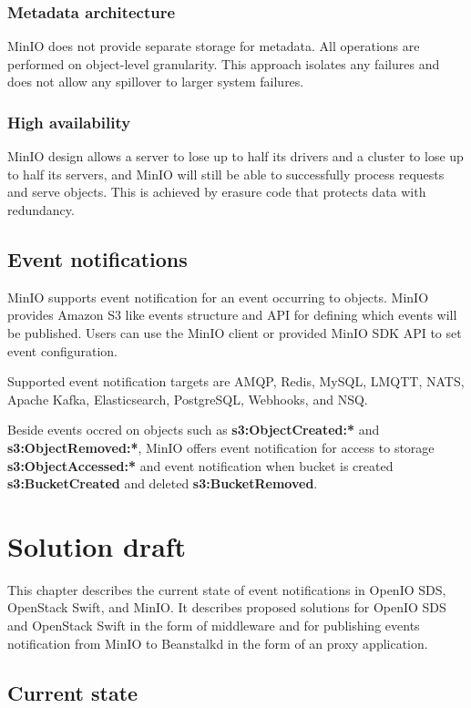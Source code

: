     \subsection*{Metadata architecture}
    MinIO does not provide separate storage for metadata. All operations are performed on object-level granularity. This approach isolates any failures and does not allow any spillover to larger system failures\cite{minioIntel}.

    \subsection*{High availability}
    MinIO design allows a server to lose up to half its drivers and a cluster to lose up to half its servers, and MinIO will still be able to successfully process requests and serve objects. This is achieved by erasure code that protects data with redundancy\cite{minioIntel}.

\section{Event notifications}
    MinIO supports event notification for an event occurring to objects. MinIO provides Amazon S3 like events structure and API for defining which events will be published. Users can use the MinIO client or provided MinIO SDK API to set event configuration.

    Supported event notification targets are AMQP, Redis, MySQL, LMQTT, NATS, Apache Kafka, Elasticsearch, PostgreSQL, Webhooks, and NSQ.

    Beside events occred on objects such as \textbf{s3:ObjectCreated:*} and \textbf{s3:ObjectRemoved:*}, MinIO offers event notification for access to storage \textbf{s3:ObjectAccessed:*} and event notification when bucket is created \textbf{s3:BucketCreated} and deleted \textbf{s3:BucketRemoved}.


\chapter{Solution draft}\label{chap:solution}
    This chapter describes the current state of event notifications in OpenIO SDS, OpenStack Swift, and MinIO. It describes proposed solutions for OpenIO SDS and OpenStack Swift in the form of middleware and for publishing events notification from MinIO to Beanstalkd in the form of an proxy application.
\section{Current state}
